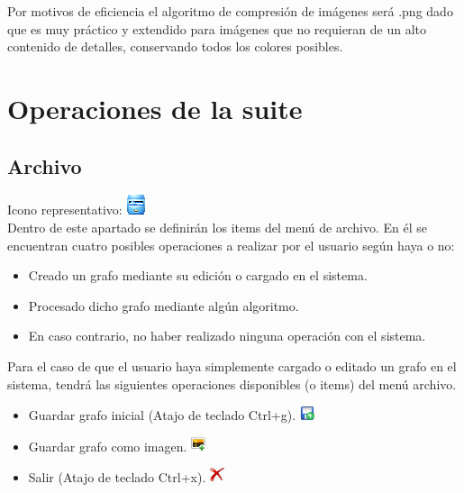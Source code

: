 Por motivos de eficiencia el algoritmo de compresión de imágenes será .png dado que es muy práctico y extendido para imágenes que no requieran de un alto contenido de detalles, conservando todos los colores posibles.

\section{Operaciones de la suite}
\subsection{Archivo}

Icono representativo: \includegraphics[scale=.7]{./imagenes_documentacion/archivo.png} \\

Dentro de este apartado se definirán los items del menú de archivo. En él se encuentran cuatro posibles operaciones a realizar por el usuario según haya o no:
\begin{itemize}
\item Creado un grafo mediante su edición o cargado en el sistema.
\item Procesado dicho grafo mediante algún algoritmo.
\item En caso contrario, no haber realizado ninguna operación con el sistema.
\end{itemize}

Para el caso de que el usuario haya simplemente cargado o editado un grafo en el sistema, tendrá las siguientes operaciones disponibles (o items) del menú archivo.

\begin{itemize}
\item Guardar grafo inicial (Atajo de teclado Ctrl+g). \quad \includegraphics[scale=.9]{./imagenes_documentacion/guardar.png} 
\item Guardar grafo como imagen. \quad \includegraphics[scale=.15]{./imagenes_documentacion/guardar_imagen.png}
\item Salir (Atajo de teclado Ctrl+x). \quad \includegraphics[scale=.9]{./imagenes_documentacion/exit.png}
\end{itemize}


